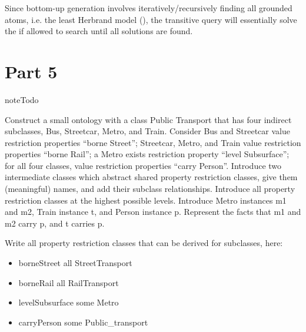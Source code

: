 \documentclass[letterpaper,10pt,english]{sphinxmanual}
\begin{document}
Since bottom-up generation involves iteratively/recursively finding all grounded
atoms, i.e. the least Herbrand model (), the  transitive query
will essentially solve the  if allowed to search until all solutions are
found.


\section{Part 5}
\label{assign3:part-5}
\begin{notice}{note}{Todo}

Construct a small ontology with a class Public Transport that has four indirect
subclasses, Bus, Streetcar, Metro, and Train. Consider Bus and Streetcar value
restriction properties “borne Street”; Streetcar, Metro, and Train value
restriction properties “borne Rail”; a Metro exists restriction property “level
Subsurface”; for all four classes, value restriction properties “carry Person”.
Introduce two intermediate classes which abstract shared property restriction
classes, give them (meaningful) names, and add their subclass relationships.
Introduce all property restriction classes at the highest possible levels.
Introduce Metro instances m1 and m2, Train instance t, and Person instance p.
Represent the facts that m1 and m2 carry p, and t carries p.

Write all property restriction classes that can be derived for subclasses, here:
\end{notice}
\begin{itemize}
\item {} 
borneStreet all StreetTransport

\item {} 
borneRail all RailTransport

\item {} 
levelSubsurface some Metro

\item {} 
carryPerson some Public\_transport

\end{itemize}
\end{document}
